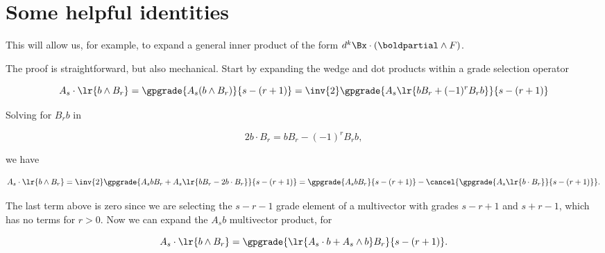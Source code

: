 %
%
\chapter{Some helpful identities}


This will allow us, for example, to expand a general inner product of the form \(d^k \Bx \cdot (\boldpartial \wedge F)\).

The proof is straightforward, but also mechanical.  Start by expanding the wedge and dot products within a grade selection operator

\begin{dmath}\label{eqn:stokesTheoremGeometricAlgebra:1460}
A_s \cdot \lr{ b \wedge B_r }
=
\gpgrade{A_s (b \wedge B_r)}{s - (r + 1)}
=
\inv{2} \gpgrade{A_s \lr{b B_r + (-1)^{r} B_r b} }{s - (r + 1)}
\end{dmath}

Solving for \(B_r b\) in

\begin{dmath}\label{eqn:stokesTheoremGeometricAlgebra:1480}
2 b \cdot B_r = b B_r - (-1)^{r} B_r b,
\end{dmath}

we have

\begin{dmath}\label{eqn:stokesTheoremGeometricAlgebra:1500}
A_s \cdot \lr{ b \wedge B_r }
=
\inv{2} \gpgrade{ A_s b B_r + A_s \lr{ b B_r - 2 b \cdot B_r } }{s - (r + 1)}
=
\gpgrade{ A_s b B_r }{s - (r + 1)}
-
\cancel{\gpgrade{ A_s \lr{ b \cdot B_r } }{s - (r + 1)}}.
\end{dmath}

The last term above is zero since we are selecting the \(s - r - 1\) grade element of a multivector with grades \(s - r + 1\) and \(s + r - 1\), which has no terms for \(r > 0\).  Now we can expand the \(A_s b\) multivector product, for

\begin{dmath}\label{eqn:stokesTheoremGeometricAlgebra:1520}
A_s \cdot \lr{ b \wedge B_r }
=
\gpgrade{ \lr{ A_s \cdot b + A_s \wedge b} B_r }{s - (r + 1)}.
\end{dmath}

